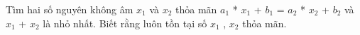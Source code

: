 Tìm hai số nguyên không âm $x_{1}$ và $x_{2}$ thỏa mãn $a_{1}$ * $x_{1}$ + $b_{1}$ = $a_{2}$ * $x_{2}$ + $b_{2}$ và $x_{1}$ + $x_{2}$ là nhỏ nhất. Biết rằng luôn tồn tại số $x_{1}$ , $x_{2}$ thỏa mãn.
